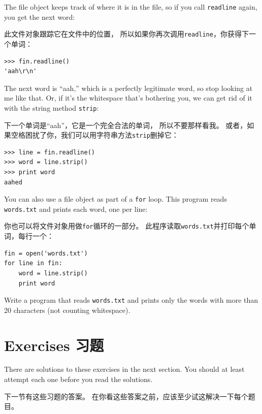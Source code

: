 \documentclass[10pt]{book}
\begin{document}
\begin{CJK}{UTF8}{gbsn}
The file object keeps track of where it is in the file, so
if you call {\tt readline} again, you get the next word:

此文件对象跟踪它在文件中的位置，
所以如果你再次调用{\tt readline}，你获得下一个单词：

\begin{verbatim}
>>> fin.readline()
'aah\r\n'
\end{verbatim}
%
The next word is ``aah,'' which is a perfectly legitimate
word, so stop looking at me like that.
Or, if it's the whitespace that's bothering you,
we can get rid of it with the string method {\tt strip}:

下一个单词是``aah''，它是一个完全合法的单词，
所以不要那样看我。
或者，如果空格困扰了你，我们可以用字符串方法{\tt strip}删掉它：

\begin{verbatim}
>>> line = fin.readline()
>>> word = line.strip()
>>> print word
aahed
\end{verbatim}
%
You can also use a file object as part of a {\tt for} loop.
This program reads {\tt words.txt} and prints each word, one
per line:

你也可以将文件对象用做{\tt for}循环的一部分。
此程序读取{\tt words.txt}并打印每个单词，每行一个：

\begin{verbatim}
fin = open('words.txt')
for line in fin:
    word = line.strip()
    print word
\end{verbatim}
%

\begin{exercise}

Write a program that reads {\tt words.txt} and prints only the
words with more than 20 characters (not counting whitespace).

\end{exercise}


\section{Exercises 习题}

There are solutions to these exercises in the next section.
You should at least attempt each one before you read the solutions.

下一节有这些习题的答案。
在你看这些答案之前，应该至少试这解决一下每个题目。

\begin{exercise}


\end{exercise}
\end{CJK}
\end{document}
